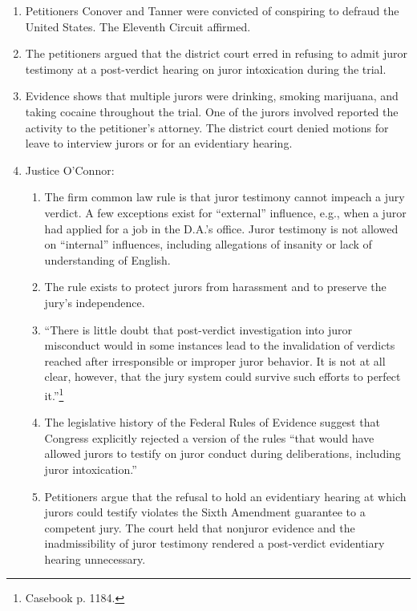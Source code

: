 \begin{enumerate}
    \item Petitioners Conover and Tanner were convicted of conspiring to 
    defraud the United States. The Eleventh Circuit affirmed.
    \item The petitioners argued that the district court erred in refusing to 
    admit juror testimony at a post-verdict hearing on juror intoxication 
    during the trial.
    \item Evidence shows that multiple jurors were drinking, smoking 
    marijuana, and taking cocaine throughout the trial. One of the jurors 
    involved reported the activity to the petitioner's attorney. The district 
    court denied motions for leave to interview jurors or for an evidentiary 
    hearing.
    \item Justice O'Connor:
    \begin{enumerate}
        \item The firm common law rule is that juror testimony cannot impeach 
        a jury verdict. A few exceptions exist for ``external'' influence, 
        e.g., when a juror had applied for a job in the D.A.'s office. Juror 
        testimony is not allowed on ``internal'' influences, including 
        allegations of insanity or lack of understanding of English.
        \item The rule exists to protect jurors from harassment and to 
        preserve the jury's independence.
        \item ``There is little doubt that post-verdict investigation into 
        juror misconduct would in some instances lead to the invalidation of 
        verdicts reached after irresponsible or improper juror behavior. It is 
        not at all clear, however, that the jury system could survive such 
        efforts to perfect it.''\footnote{Casebook p. 1184.}
        \item The legislative history of the Federal Rules of Evidence suggest 
        that Congress explicitly rejected a version of the rules ``that would 
        have allowed jurors to testify on juror conduct during deliberations, 
        including juror intoxication.''
        \item Petitioners argue that the refusal to hold an evidentiary 
        hearing at which jurors could testify violates the Sixth Amendment 
        guarantee to a competent jury. The court held that nonjuror evidence 
        and the inadmissibility of juror testimony rendered a post-verdict 
        evidentiary hearing unnecessary.

\end{enumerate}
\end{enumerate}
